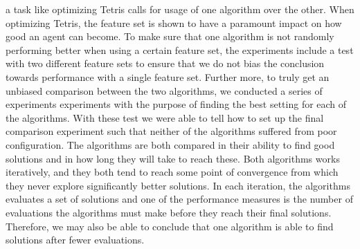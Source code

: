 a task like optimizing Tetris calls for usage of one algorithm over the other.
When optimizing Tetris, the feature set is shown to have a paramount impact on
how good an agent can become. To make sure that one algorithm is not randomly performing
better when using a certain feature set, the experiments include a test with two different 
feature sets to ensure that we do not bias the conclusion towards performance with a 
single feature set. Further more, to truly get an unbiased comparison between the two 
algorithms, we conducted a series of experiments experiments with the purpose of finding
the best setting for each of the algorithms. With these test we were able to 
tell how to set up the final comparison experiment such that neither of the
algorithms suffered from poor configuration. The algorithms are both 
compared in their ability to find good solutions and in how long they will 
take to reach these. Both algorithms works iteratively, and they both tend to
reach some point of convergence from which they never explore significantly better 
solutions. In each iteration, the algorithms evaluates a set of solutions and one of the
performance measures is the number of evaluations the algorithms must make 
before they reach their final solutions. Therefore, we may also be able to conclude 
that one algorithm is able to find solutions after fewer evaluations.




